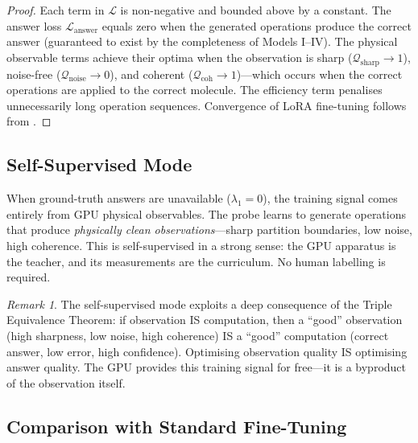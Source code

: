 \documentclass[11pt,twocolumn,a4paper]{article}
\theoremstyle{definition}
\theoremstyle{remark}
\newtheorem{remark}[theorem]{Remark}
\newcommand{\Loss}{\mathcal{L}}
\begin{document}
\begin{proof}
Each term in $\Loss$ is non-negative and bounded above by a constant. The answer loss $\Loss_{\mathrm{answer}}$ equals zero when the generated operations produce the correct answer (guaranteed to exist by the completeness of Models I--IV). The physical observable terms achieve their optima when the observation is sharp ($\mathcal{Q}_{\mathrm{sharp}} \to 1$), noise-free ($\mathcal{Q}_{\mathrm{noise}} \to 0$), and coherent ($\mathcal{Q}_{\mathrm{coh}} \to 1$)---which occurs when the correct operations are applied to the correct molecule. The efficiency term penalises unnecessarily long operation sequences. Convergence of LoRA fine-tuning follows from \citet{hu2022}.
\end{proof}

\subsection{Self-Supervised Mode}

When ground-truth answers are unavailable ($\lambda_1 = 0$), the training signal comes entirely from GPU physical observables. The probe learns to generate operations that produce \emph{physically clean observations}---sharp partition boundaries, low noise, high coherence. This is self-supervised in a strong sense: the GPU apparatus is the teacher, and its measurements are the curriculum. No human labelling is required.

\begin{remark}
The self-supervised mode exploits a deep consequence of the Triple Equivalence Theorem: if observation IS computation, then a ``good'' observation (high sharpness, low noise, high coherence) IS a ``good'' computation (correct answer, low error, high confidence). Optimising observation quality IS optimising answer quality. The GPU provides this training signal for free---it is a byproduct of the observation itself.
\end{remark}

\subsection{Comparison with Standard Fine-Tuning}
\end{document}
